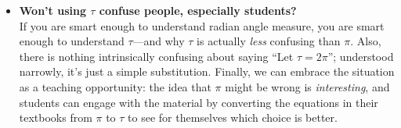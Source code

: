 \documentclass{article}
\begin{document}
\begin{itemize}
  \item \textbf{Won't using $\tau$ confuse people, especially students?} \\  If you are smart enough to understand radian angle measure, you are smart enough to understand $\tau$---and  why $\tau$ is actually \emph{less} confusing than $\pi$. Also, there is nothing intrinsically confusing about saying ``Let $\tau = 2\pi$''; understood narrowly, it's just a simple substitution. Finally, we can embrace the situation as a teaching opportunity: the idea that $\pi$ might be wrong is \emph{interesting}, and students can engage with the material by converting the equations in their textbooks from $\pi$ to $\tau$ to see for themselves which choice is better. %
  


\end{itemize}
\end{document}
